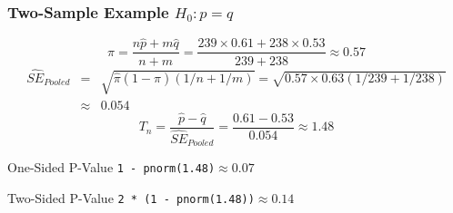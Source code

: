 \documentclass[handout]{beamer}
\begin{document}
\begin{frame}
	\frametitle{Two-Sample Example $H_0\colon p = q$}
	\small
$$\widehat{\pi} = \frac{n\widehat{p}+ m\widehat{q}}{n + m} = \frac{239 \times 0.61 + 238 \times 0.53}{239 + 238}\approx 0.57$$
	\begin{eqnarray*}
	\widehat{SE}_{Pooled} &=&  \sqrt{\widehat{\pi}(1-\widehat{\pi})\left( 1/n + 1/m \right) }= \sqrt{0.57 \times 0.63 (1/239 + 1/238)}\\
		&\approx& 0.054
	\end{eqnarray*}
$$T_n = \frac{\widehat{p} - \widehat{q}}{\widehat{SE}_{Pooled}}= \frac{0.61 - 0.53}{0.054} \approx 1.48$$
\begin{block}
	{One-Sided P-Value}
	\texttt{1 - pnorm(1.48)}$\approx 0.07$
\end{block}\begin{block}
	{Two-Sided P-Value}
	\texttt{2 * (1 - pnorm(1.48))}$\approx 0.14$
\end{block}
\end{frame}
\end{document}
